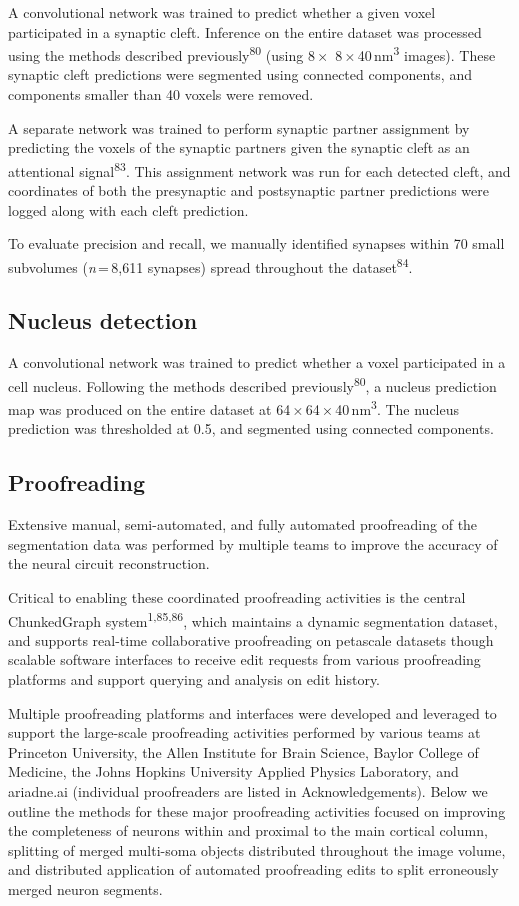 \documentclass{article}
\begin{document}
A convolutional network was trained to predict whether a given voxel participated in a synaptic cleft. Inference on the entire dataset was processed using the methods described previously\textsuperscript{80} (using 8\,×\, 8\,×\,40\,nm\textsuperscript{3} images). These synaptic cleft predictions were segmented using connected components, and components smaller than 40 voxels were removed.

A separate network was trained to perform synaptic partner assignment by predicting the voxels of the synaptic partners given the synaptic cleft as an attentional signal\textsuperscript{83}. This assignment network was run for each detected cleft, and coordinates of both the presynaptic and postsynaptic partner predictions were logged along with each cleft prediction.

To evaluate precision and recall, we manually identified synapses within 70 small subvolumes (\emph{n}\,=\,8,611 synapses) spread throughout the dataset\textsuperscript{84}.

\subsection*{Nucleus detection}

A convolutional network was trained to predict whether a voxel participated in a cell nucleus. Following the methods described previously\textsuperscript{80}, a nucleus prediction map was produced on the entire dataset at 64\,×\,64\,×\,40\,nm\textsuperscript{3}. The nucleus prediction was thresholded at 0.5, and segmented using connected components.

\subsection*{Proofreading}

Extensive manual, semi-automated, and fully automated proofreading of the segmentation data was performed by multiple teams to improve the accuracy of the neural circuit reconstruction.

Critical to enabling these coordinated proofreading activities is the central ChunkedGraph system\textsuperscript{1,85,86}, which maintains a dynamic segmentation dataset, and supports real-time collaborative proofreading on petascale datasets though scalable software interfaces to receive edit requests from various proofreading platforms and support querying and analysis on edit history.

Multiple proofreading platforms and interfaces were developed and leveraged to support the large-scale proofreading activities performed by various teams at Princeton University, the Allen Institute for Brain Science, Baylor College of Medicine, the Johns Hopkins University Applied Physics Laboratory, and ariadne.ai (individual proofreaders are listed in Acknowledgements). Below we outline the methods for these major proofreading activities focused on improving the completeness of neurons within and proximal to the main cortical column, splitting of merged multi-soma objects distributed throughout the image volume, and distributed application of automated proofreading edits to split erroneously merged neuron segments.
\end{document}
